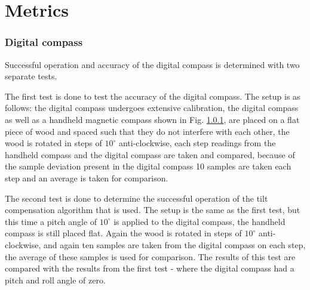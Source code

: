\section{Metrics}



\subsubsection{Digital compass}
Successful operation and accuracy of the digital compass is determined with two separate tests. 

The first test is done to test the accuracy of the digital 
compass. The setup is as follows: the digital compass undergoes extensive calibration, the digital compass as well as a handheld magnetic compass shown 
in Fig. \ref{}, are placed on a flat piece of wood and 
spaced such that they do not interfere with each other, the wood is rotated in steps of $10^{\circ}$ anti-clockwise, each step readings from the handheld 
compass and the digital compass are taken and compared, because of the sample deviation present in the digital compass 10 samples are taken each step and 
an average is taken for comparison. 

The second test is done to determine the successful operation of the tilt compensation algorithm that is used. The 
setup is the same as the first test, but this time a pitch angle of $10^{\circ}$ is applied to the digital compass, the handheld compass is still placed 
flat. Again the wood is rotated in steps of $10^{\circ}$ anti-clockwise, and again ten samples are taken from the digital compass on each step, the average
of these samples is used for comparison. The results of this test are compared with the results from the first test - where the digital compass had a pitch 
and roll angle of zero. 

